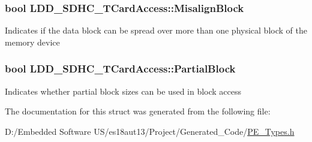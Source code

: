 \subsubsection[{Misalign\+Block}]{\setlength{\rightskip}{0pt plus 5cm}bool L\+D\+D\+\_\+\+S\+D\+H\+C\+\_\+\+T\+Card\+Access\+::\+Misalign\+Block}\label{struct_l_d_d___s_d_h_c___t_card_access_aa56e65353fd03ffdbd8cc8d19537b621}
Indicates if the data block can be spread over more than one physical block of the memory device \hypertarget{struct_l_d_d___s_d_h_c___t_card_access_a9d78668915e934548a04351b20ec2d0a}{}
\subsubsection[{Partial\+Block}]{\setlength{\rightskip}{0pt plus 5cm}bool L\+D\+D\+\_\+\+S\+D\+H\+C\+\_\+\+T\+Card\+Access\+::\+Partial\+Block}\label{struct_l_d_d___s_d_h_c___t_card_access_a9d78668915e934548a04351b20ec2d0a}
Indicates whether partial block sizes can be used in block access 

The documentation for this struct was generated from the following file\+:\begin{DoxyCompactItemize}
\item 
D\+:/\+Embedded Software U\+S/es18aut13/\+Project/\+Generated\+\_\+\+Code/\hyperlink{_p_e___types_8h}{P\+E\+\_\+\+Types.\+h}\end{DoxyCompactItemize}
